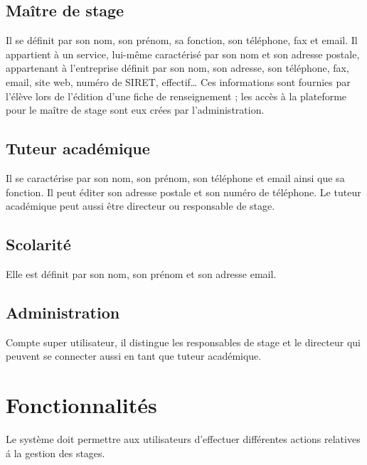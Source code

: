 \documentclass{scrreprt}
\begin{document}
\subsection{Ma\^itre de stage}
Il se d\'efinit par son nom, son pr\'enom, sa fonction, son t\'el\'ephone, fax et email. Il appartient \`a un service, lui-m\^eme caract\'eris\'e par son nom et son adresse postale, appartenant à l’entreprise définit par son nom, son adresse, son t\'el\'ephone, fax, email, site web,  num\'ero de SIRET, effectif… Ces informations sont fournies par l’\'el\`eve lors de l’\'edition d’une fiche de renseignement ; les acc\`es \`a la plateforme pour le ma\^itre de stage sont eux cr\'ees par l’administration.

\subsection{Tuteur acad\'emique}
Il se caract\'erise par son nom, son pr\'enom, son t\'el\'ephone et email ainsi que sa fonction. Il peut \'editer son adresse postale et son num\'ero de t\'el\'ephone.
Le tuteur acad\'emique peut aussi \^etre directeur ou responsable de stage.

\newpage
\subsection{Scolarit\'e}
Elle est d\'efinit par son nom, son pr\'enom et son adresse email.

\subsection{Administration}
Compte super utilisateur, il distingue les responsables de stage et le directeur qui peuvent se connecter aussi en tant que tuteur acad\'emique.

\section{Fonctionnalit\'es}
Le syst\`eme doit permettre aux utilisateurs d’effectuer diff\'erentes actions relatives \'a la gestion des stages.
\end{document}
